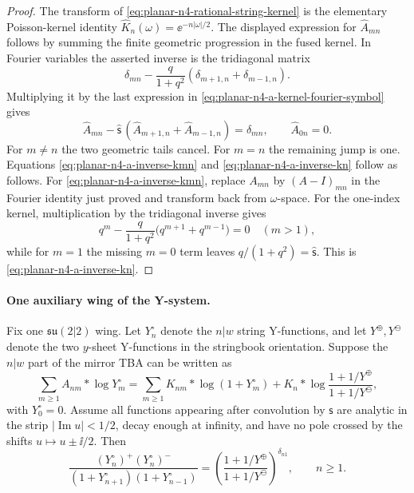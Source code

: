 \begin{proof}
The transform of \eqref{eq:planar-n4-rational-string-kernel} is the elementary
Poisson-kernel identity \(\widehat K_n(\omega)=\ee^{-n|\omega|/2}\).  The
displayed expression for \(\widehat A_{mn}\) follows by summing the finite
geometric progression in the fused kernel.  In Fourier variables the asserted
inverse is the tridiagonal matrix
\[
  \delta_{mn}
  -
  \frac{q}{1+q^2}(\delta_{m+1,n}+\delta_{m-1,n}).
\]
Multiplying it by the last expression in
\eqref{eq:planar-n4-a-kernel-fourier-symbol} gives
\[
  \widehat A_{mn}
  -
  \widehat{\mathsf s}\,
  (\widehat A_{m+1,n}+\widehat A_{m-1,n})
  =
  \delta_{mn},
  \qquad \widehat A_{0n}=0.
\]
For \(m\neq n\) the two geometric tails cancel.  For \(m=n\) the remaining
jump is one.  Equations \eqref{eq:planar-n4-a-inverse-kmn} and
\eqref{eq:planar-n4-a-inverse-kn} follow as follows.  For
\eqref{eq:planar-n4-a-inverse-kmn}, replace \(A_{mn}\) by
\((A-I)_{mn}\) in the Fourier identity just proved and transform back from
\(\omega\)-space.  For the one-index kernel, multiplication by the
tridiagonal inverse gives
\[
  q^m-\frac{q}{1+q^2}\bigl(q^{m+1}+q^{m-1}\bigr)=0
  \quad (m>1),
\]
while for \(m=1\) the missing \(m=0\) term leaves
\(q/(1+q^2)=\widehat{\mathsf s}\).  This is
\eqref{eq:planar-n4-a-inverse-kn}.
\end{proof}

\paragraph{One auxiliary wing of the Y-system.}
Fix one \(\mathfrak{su}(2|2)\) wing.  Let \(Y_n^\circ\) denote the \(n|w\)
string Y-functions, and let \(Y^\oplus,Y^\ominus\) denote the two \(y\)-sheet
Y-functions in the stringbook orientation.  Suppose the \(n|w\) part of the
mirror TBA can be written as
\begin{equation}
  \sum_{m\geq 1}A_{nm}*\log Y_m^\circ
  =
  \sum_{m\geq 1}K_{nm}*\log(1+Y_m^\circ)
  +
  K_n*\log\frac{1+1/Y^\oplus}{1+1/Y^\ominus},
  \label{eq:planar-n4-wing-tba-a-form}
\end{equation}
with \(Y_0^\circ=0\).  Assume all functions appearing after convolution by
\(\mathsf s\) are analytic in the strip \(|\operatorname{Im}u|<1/2\), decay
enough at infinity, and have no pole crossed by the shifts
\(u\mapsto u\pm\ii/2\).  Then
\begin{equation}
  \frac{(Y_n^\circ)^+(Y_n^\circ)^-}
       {(1+Y_{n+1}^\circ)(1+Y_{n-1}^\circ)}
  =
  \left(
    \frac{1+1/Y^\oplus}{1+1/Y^\ominus}
  \right)^{\delta_{n1}},
  \qquad n\geq 1.
  \label{eq:planar-n4-wing-y-system}
\end{equation}

